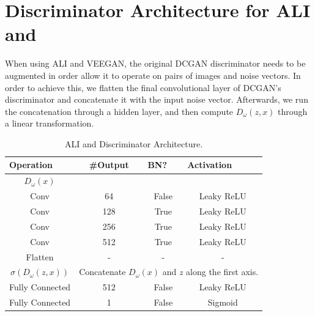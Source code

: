 \section{Discriminator Architecture for ALI and \acronym}
When using ALI and VEEGAN, the original DCGAN discriminator needs to be augmented in order allow it to operate on pairs of images and noise vectors.
In order to achieve this, we flatten the final convolutional layer of DCGAN's discriminator and concatenate it with the input noise vector. Afterwards, we run the concatenation through a hidden layer, and then compute $D_\omega(z,x)$ through a linear transformation.

\begin{table}[h]
\centering
\caption{ALI and \acronym Discriminator Architecture.}
\label{tab:arch}
\begin{tabular}{|c|c|c|c|}
\hline
\multicolumn{1}{|l|}{\textbf{Operation}} & \textbf{\#Output} & \multicolumn{1}{l|}{\textbf{BN?}} & \multicolumn{1}{l|}{\textbf{Activation}} \\ \hline
{$D_\omega(x)$}                            & \multicolumn{3}{l|}{}                                                                            \\ \hline
Conv                                     & 64                & False                             & Leaky ReLU                               \\ \hline
Conv                                     & 128               & True                              & Leaky ReLU                               \\ \hline
Conv                                     & 256               & True                              & Leaky ReLU                               \\ \hline
Conv                                     & 512               & True                              & Leaky ReLU                               \\ \hline
Flatten                                  & -                 & -                                 & -                                        \\ \hline
\textbf{$\sigma(D_\omega(z,x))$}                          & \multicolumn{3}{l|}{Concatenate $D_\omega(x)$ and $z$ along the first axis.}                      \\ \hline
Fully Connected                          & 512               & False                             & Leaky ReLU                               \\ \hline
Fully Connected                          & 1                 & False                             & Sigmoid                                  \\ \hline
\end{tabular}
\end{table}

